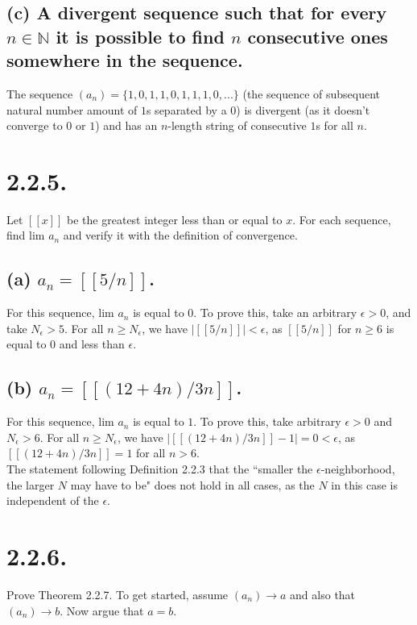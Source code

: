 \documentclass[12pt,letterpaper]{article}
\begin{document}
\subsection*{(c) A divergent sequence such that for every \(n \in \mathbb{N}\) it is possible to find \(n\) consecutive ones somewhere in the sequence.}

The sequence \((a_{n}) = \{1, 0, 1, 1, 0, 1, 1, 1, 0, ...\}\) (the sequence of subsequent natural number amount of \(1\)s separated by a \(0\)) is divergent (as it doesn't converge to \(0\) or \(1\)) and has an \(n\)-length string of consecutive \(1\)s for all \(n\).

\section*{2.2.5.}
Let \([[x]]\) be the greatest integer less than or equal to \(x\). For each sequence, find lim \(a_{n}\) and verify it with the definition of convergence.

\subsection*{(a) \(a_{n} = [[5/n]]\).}

For this sequence, lim \(a_{n}\) is equal to \(0\). To prove this, take an arbitrary \(\epsilon > 0\), and take \(N_{\epsilon} > 5\). For all \(n \geq N_{\epsilon}\), we have \(\left|[[5/n]]\right| < \epsilon\), as \([[5/n]]\) for \(n \geq 6\) is equal to \(0\) and less than \(\epsilon\).


\subsection*{(b) \(a_{n} = [[(12 + 4n)/3n]]\).}

For this sequence, lim \(a_{n}\) is equal to \(1\). To prove this, take arbitrary \(\epsilon > 0\) and \(N_{\epsilon} > 6\). For all \(n \geq N_{\epsilon}\), we have \(\left|[[(12+4n)/3n]] - 1\right| = 0 < \epsilon\), as \([[(12+4n)/3n]] = 1\) for all \(n > 6\). \\

The statement following Definition 2.2.3 that the ``smaller the \(\epsilon\)-neighborhood, the larger \(N\) may have to be" does not hold in all cases, as the \(N\) in this case is independent of the \(\epsilon\).

\section*{2.2.6.}
Prove Theorem 2.2.7. To get started, assume \((a_{n}) \to a\) and also that \((a_{n}) \to b\). Now argue that \(a = b\). \\
\end{document}

